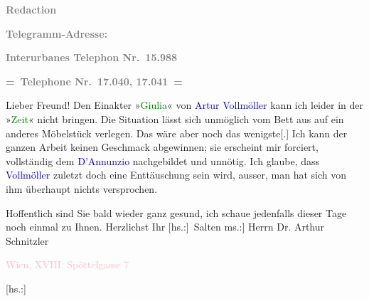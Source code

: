 \pstart
           \textcolor{gray}{\textbf{Redaction}}\pend
           
\pstart
           \textcolor{gray}{\textbf{Telegramm-Adresse: \textcolor{brown}{}{}\ledrightnote{\textcolor{brown}{Die Zeit}}\so{,{ }}\textcolor{pink}{}{}\ledrightnote{\textcolor{pink}{Wien}}}}\pend
           
\pstart
           \textcolor{gray}{\textbf{Interurbanes Telephon Nr. 15.988}}\pend
           
\pstart
           \textcolor{gray}{\textbf{= Telephone Nr. 17.040, 17.041 =}}\pend
           
\pstart\center{}Lieber Freund!\pend
\pstart
           Den Einakter »\textcolor{green}{Giulia}{}\ledrightnote{\textcolor{green}{Giulia. Drama in einem Akt}}« von \textcolor{blue}{Artur Vollmöller}{}\ledrightnote{\textcolor{blue}{Karl Gustav Vollmoeller}} kann ich leider in der »\textcolor{green}{Zeit}{}\ledrightnote{\textcolor{green}{Die Zeit}}« nicht bringen. Die Situation lässt sich unmöglich vom
               Bett aus auf ein anderes Möbelstück verlegen. Das wäre aber noch das
                  wenigste{[}.{]} Ich kann der ganzen Arbeit keinen Geschmack
               abgewinnen; sie erscheint mir forciert, vollständig dem \textcolor{blue}{D’Annunzio}{}\ledrightnote{\textcolor{blue}{Gabriele D’Annunzio}} nachgebildet und unnötig. Ich glaube, dass \textcolor{blue}{Vollmöller}{}\ledrightnote{\textcolor{blue}{Karl Gustav Vollmoeller}} zuletzt doch eine Enttäuschung sein
               wird, ausser, man hat sich von ihm überhaupt nichts versprochen. \pend
           
\pstart
           Hoffentlich sind Sie bald wieder ganz gesund, ich schaue jedenfalls dieser Tage noch
               einmal zu Ihnen. \pend
           \pstart Herzlichst Ihr \spacefill\mbox{{[}hs.:{]} Salten}\pend{}
\pstart
           \noindent{}{[}ms.:{]} Herrn Dr. Arthur Schnitzler\pend
           
\pstart
           \textcolor{pink}{Wien, XVIII. Spöttelgasse 7}{}\ledrightnote{\textcolor{pink}{Edmund-Weiß-Gasse}}\pend
           
\pstart
           {[}hs.:{]} \label{K_L03398-1v}\label{K_L03398-1h}\pend
           \endnumbering{}
\begin{anhang}
\end{anhang}
      